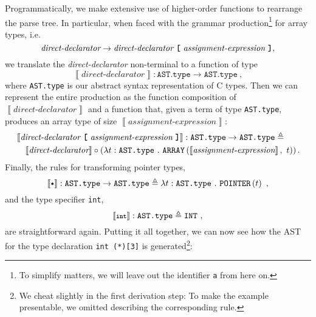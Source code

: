 \documentclass[a4paper,12pt]{scrbook}
\theoremstyle{plain}
\theoremstyle{definition}
\newcommand{\define}[0]{\triangleq}
\newcommand{\ckw}[1]{{\text{\footnotesize\bfseries\ttfamily{#1}}}}
\begin{document}
Programmatically, we make extensive use of higher-order functions to rearrange
the parse tree. In particular, when faced with the grammar
production\footnote{To simplify matters, we will leave out the identifier
  \lstinline{a} from here on.} for array types, i.e.
\begin{equation*}
\textit{direct-declarator}
\rightarrow
\textit{direct-declarator} ~ \texttt{{\bfseries[}} ~
\textit{assignment-expression} ~ \texttt{{\bfseries]}} ,
\end{equation*}
we translate the \textit{direct-declarator} non-terminal to a function of type
\begin{equation*}
\left\llbracket \textit{direct-declarator} \right\rrbracket
: \texttt{AST.type} \rightarrow \texttt{AST.type} ~,
\end{equation*}
where \texttt{AST.type} is our abstract syntax representation of C types. Then
we can represent the entire production as the function composition of
$\left\llbracket \textit{direct-declarator} \right\rrbracket$ and a function
that, given a term of type \texttt{AST.type}, produces an array type of size
$\left\llbracket \textit{assignment-expression} \right\rrbracket$:
\begin{align*}
&\left\llbracket \textit{direct-declarator} ~ \texttt{{\bfseries[}} ~
\textit{assignment-expression} ~ \texttt{{\bfseries]}} \right\rrbracket : \texttt{AST.type} \rightarrow \texttt{AST.type} \define \\
&\quad \left\llbracket \textit{direct-declarator} \right\rrbracket \circ
\left(\lambda t : \texttt{AST.type} ~.~ \texttt{ARRAY} \left(\left\llbracket
    \textit{assignment-expression} \right\rrbracket,~ t\right)\right) .
\end{align*}
Finally, the rules for transforming pointer types,
\begin{equation*}
\left\llbracket \ckw{*} \right\rrbracket
 : \texttt{AST.type} \rightarrow \texttt{AST.type} \define
\lambda t : \texttt{AST.type} ~.~ \texttt{POINTER} \left( t \right) ~,
\end{equation*}
and the type specifier \lstinline{int},
\begin{equation*}
\left\llbracket \ckw{int} \right\rrbracket : \texttt{AST.type} \define \texttt{INT} ~,
\end{equation*}
are straightforward again. Putting it all together, we can now see how the AST
for the type declaration \lstinline{int (*)[3]} is generated\footnote{We cheat
  slightly in the first derivation step: To make the example presentable, we
  omitted describing the corresponding rule.}:
\end{document}
